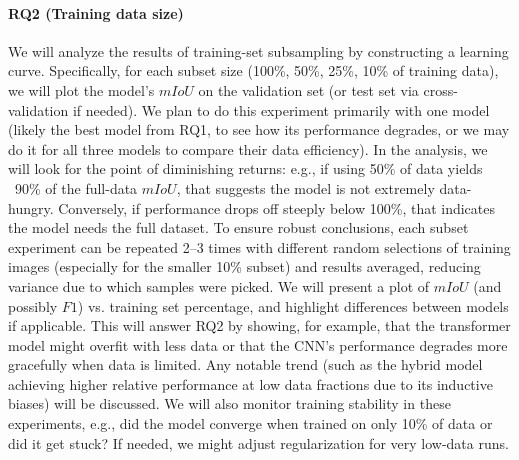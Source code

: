 \documentclass[conference]{IEEEtran}
\begin{document}
\paragraph*{RQ2 (Training data size)} We will analyze the results of training-set subsampling by constructing a learning curve. Specifically, for each subset size (100\%, 50\%, 25\%, 10\% of training data), we will plot the model’s $mIoU$ on the validation set (or test set via cross-validation if needed). We plan to do this experiment primarily with one model (likely the best model from RQ1, to see how its performance degrades, or we may do it for all three models to compare their data efficiency). In the analysis, we will look for the point of diminishing returns: e.g., if using 50\% of data yields ~90\% of the full-data $mIoU$, that suggests the model is not extremely data-hungry. Conversely, if performance drops off steeply below 100\%, that indicates the model needs the full dataset. To ensure robust conclusions, each subset experiment can be repeated 2–3 times with different random selections of training images (especially for the smaller 10\% subset) and results averaged, reducing variance due to which samples were picked. We will present a plot of $mIoU$ (and possibly $F1$) vs. training set percentage, and highlight differences between models if applicable. This will answer RQ2 by showing, for example, that the transformer model might overfit with less data or that the CNN's performance degrades more gracefully when data is limited. Any notable trend (such as the hybrid model achieving higher relative performance at low data fractions due to its inductive biases) will be discussed. We will also monitor training stability in these experiments, e.g., did the model converge when trained on only 10\% of data or did it get stuck? If needed, we might adjust regularization for very low-data runs.
\end{document}
